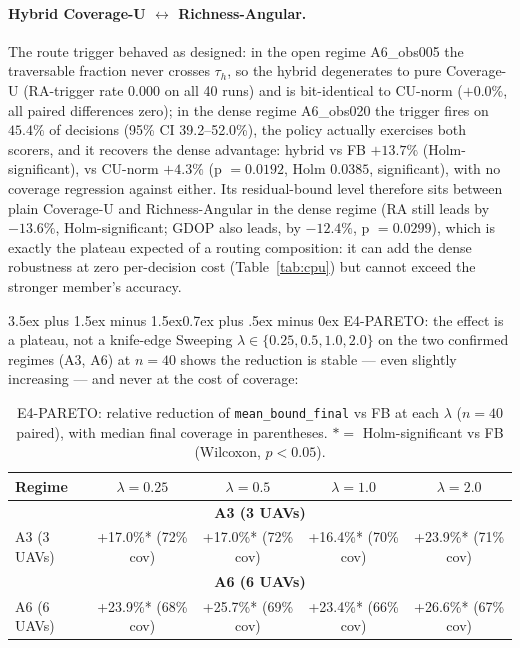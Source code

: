 \documentclass[journal]{IEEEtran}
\makeatletter
\newcommand{\CU}{Coverage-U}
\newcommand{\RA}{Richness-Angular}
\renewcommand{\subsection}{\@startsection{subsection}{2}{\z@}%
{3.5ex plus 1.5ex minus 1.5ex}{0.7ex plus .5ex minus 0ex}%
{\normalfont\normalsize\bfseries}}
\makeatother
\begin{document}
\paragraph{Hybrid \CU{} $\leftrightarrow$ \RA{}.}
The route trigger behaved as designed: in the open regime A6\_obs005 the
traversable fraction never crosses $\tau_h$, so the hybrid degenerates to pure
\CU{} (RA-trigger rate $0.000$ on all 40 runs) and is bit-identical to CU-norm
($+0.0\%$, all paired differences zero); in
the dense regime A6\_obs020 the trigger fires on $45.4\%$ of decisions
(95\% CI 39.2--52.0\%), the policy actually exercises both scorers, and it
recovers the dense advantage: hybrid vs FB $+13.7\%$ (Holm-significant), vs
CU-norm $+4.3\%$ (p $= 0.0192$, Holm $0.0385$, significant), with no coverage
regression against either. Its residual-bound level therefore sits between
plain \CU{} and \RA{} in the dense regime (RA still leads by $-13.6\%$,
Holm-significant; GDOP also leads, by $-12.4\%$, p $= 0.0299$), which is
exactly the plateau expected of a routing composition: it can add the dense
robustness at zero per-decision cost (Table~\ref{tab:cpu}) but cannot exceed
the stronger member's accuracy.

\subsection{E4-PARETO: the effect is a plateau, not a knife-edge}
Sweeping $\lambda \in \{0.25, 0.5, 1.0, 2.0\}$ on the two confirmed regimes
(A3, A6) at $n = 40$ shows the reduction is stable --- even slightly increasing
--- and never at the cost of coverage:

\begin{table}[t]
\caption{E4-PARETO: relative reduction of \texttt{mean\_bound\_final} vs FB at each $\lambda$ ($n = 40$ paired), with median final coverage in parentheses. $* =$ Holm-significant vs FB (Wilcoxon, $p < 0.05$).}
\label{tab:pareto}
\centering
\begin{tabular}{l c c c c}
\toprule
Regime & $\lambda{=}0.25$ & $\lambda{=}0.5$ & $\lambda{=}1.0$ & $\lambda{=}2.0$ \\
\midrule
\multicolumn{5}{c}{\textbf{A3 (3 UAVs)}} \\
\midrule
A3 (3 UAVs) & +17.0\%* (72\% cov) & +17.0\%* (72\% cov) & +16.4\%* (70\% cov) & +23.9\%* (71\% cov) \\
\multicolumn{5}{c}{\textbf{A6 (6 UAVs)}} \\
\midrule
A6 (6 UAVs) & +23.9\%* (68\% cov) & +25.7\%* (69\% cov) & +23.4\%* (66\% cov) & +26.6\%* (67\% cov) \\
\bottomrule
\end{tabular}
\end{table}
\end{document}

